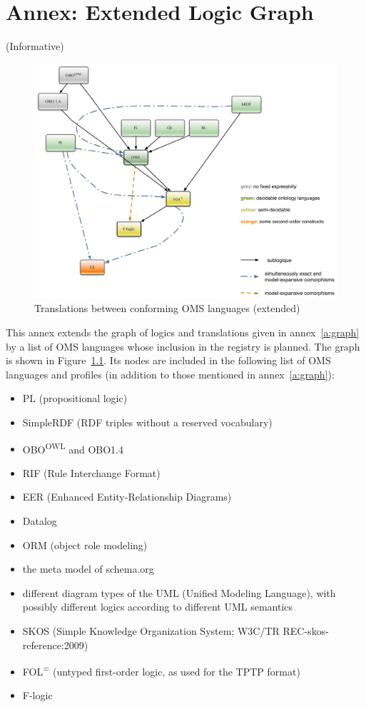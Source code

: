 \documentclass[10pt,fleqn,final]{scrreprt}
\newcommand{\annexrefname}{annex}
\newcommand{\figurerefname}{Figure}
\newcommand{\aref}[1]{\annexrefname~\ref{#1}}
\newcommand{\fref}[1]{\figurerefname~\ref{#1}}
\newcommand{\informative}[0]{{\begin{center}{\Large{(Informative})}\end{center}} \bigskip}
\newcommand{\nisref}[1]{#1}
\newcommand{\infannex}[1]{ \chapter{Annex: #1}  \informative }
\newenvironment{definitions}[0]{\medskip }{}
\begin{document}
\begin{definitions}
\infannex{Extended Logic Graph}\label{a:ext-graph}

\begin{figure}
  \centering
  \includegraphics[width=\textwidth]{illustrations/pre-reduced-ontograph}
  \caption{Translations between conforming OMS languages (extended)}
  \label{fig:pre-ontograph}
\end{figure}
This annex extends the graph of logics and translations given in
\aref{a:graph} by a list of OMS languages  whose inclusion in
the registry is planned.  The graph is shown in
\fref{fig:pre-ontograph}.  Its nodes are included in the following
list of OMS languages and profiles (in addition to those
mentioned in \aref{a:graph}):
\begin{itemize}
\item PL (propositional logic)
\item SimpleRDF (RDF triples without a reserved vocabulary)
\item OBO\textsuperscript{OWL} and OBO1.4
\item RIF (Rule Interchange Format)
\item EER (Enhanced Entity-Relationship Diagrams) %
\item Datalog
\item ORM (object role modeling)
\item the meta model of schema.org
\item different diagram types of the UML (Unified Modeling Language), with possibly different logics according to different
UML semantics
\item SKOS (Simple Knowledge Organization System; \nisref{W3C/TR REC-skos-reference:2009})
\item FOL\textsuperscript{=} (untyped first-order logic, as used for the
TPTP format)
\item F-logic
\end{itemize}


\end{definitions}
\end{document}
